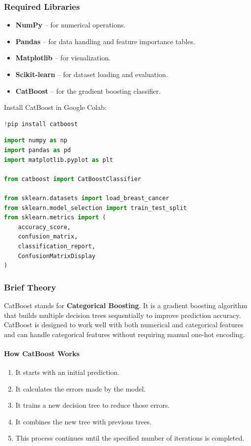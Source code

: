 \documentclass[a4paper,11pt]{article}
\begin{document}
\begin{itemize}
\subsubsection{Required Libraries}
\begin{itemize}
    \item \textbf{NumPy} -- for numerical operations.
    \item \textbf{Pandas} -- for data handling and feature importance tables.
    \item \textbf{Matplotlib} -- for visualization.
    \item \textbf{Scikit-learn} -- for dataset loading and evaluation.
    \item \textbf{CatBoost} -- for the gradient boosting classifier.
\end{itemize}

Install CatBoost in Google Colab:
\begin{lstlisting}[language=Python, caption={Install catboost}]
!pip install catboost
\end{lstlisting}

\begin{lstlisting}[language=Python, caption={Required Imports}]
import numpy as np
import pandas as pd
import matplotlib.pyplot as plt

from catboost import CatBoostClassifier

from sklearn.datasets import load_breast_cancer
from sklearn.model_selection import train_test_split
from sklearn.metrics import (
    accuracy_score,
    confusion_matrix,
    classification_report,
    ConfusionMatrixDisplay
)
\end{lstlisting}

\subsubsection{Brief Theory}
CatBoost stands for \textbf{Categorical Boosting}. It is a gradient boosting algorithm that builds multiple decision trees sequentially to improve prediction accuracy. CatBoost is designed to work well with both numerical and categorical features and can handle categorical features without requiring manual one-hot encoding.

\paragraph{How CatBoost Works}
\begin{enumerate}
    \item It starts with an initial prediction.
    \item It calculates the errors made by the model.
    \item It trains a new decision tree to reduce those errors.
    \item It combines the new tree with previous trees.
    \item This process continues until the specified number of iterations is completed.
\end{enumerate}


\end{itemize}
\end{document}
